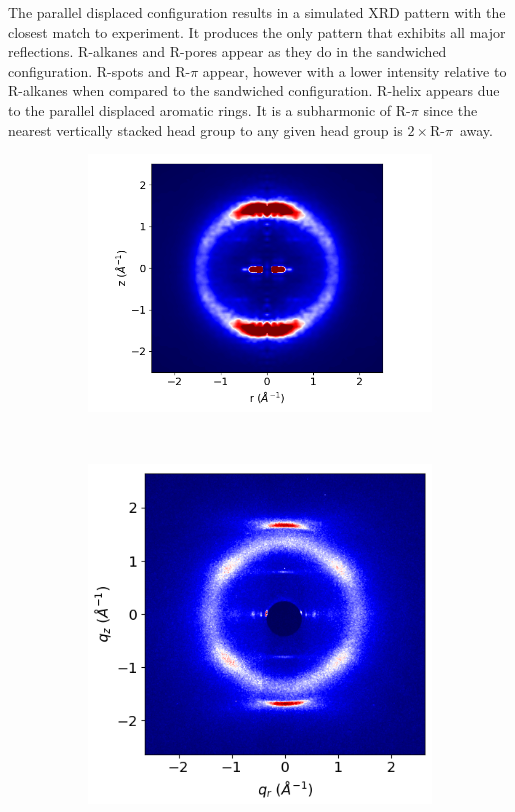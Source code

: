 \documentclass[journal=jpcbfk,manusciprt=article]{achemso}
\begin{document}
  The parallel displaced configuration results in a simulated XRD pattern with
  the closest match to experiment. It produces the only pattern that exhibits all
  major reflections. R-alkanes and R-pores appear as they do in the sandwiched
  configuration. R-spots and R-$\pi$ appear, however with a lower intensity
  relative to R-alkanes when compared to the sandwiched configuration. R-helix
  appears due to the parallel displaced aromatic rings. It is a subharmonic of
  R-$\pi$ since the nearest vertically stacked head group to any given head group
  is $2\times$R-$\pi$~away. 
  \begin{figure}
  \begin{subfigure}{0.3\linewidth}
        \centering
        \vspace{-0.2em}
        \includegraphics[width=1.1\linewidth,trim={1cm 0 1.3cm 0},clip]{offset_rzplot.png}
        \caption{}~\label{fig:rz_offset}
  \end{subfigure}
  \begin{subfigure}{0.3\linewidth}
        \centering
        \includegraphics[scale=0.285]{WAXS_raw.png}

\end{subfigure}
\end{figure}
\end{document}
